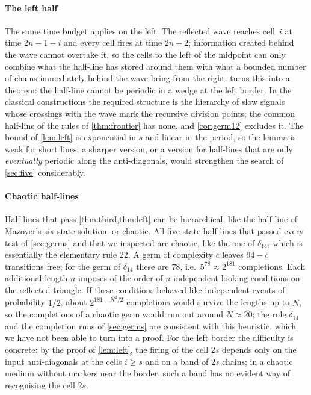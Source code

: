\paragraph{The left half}
The same time budget applies on the left. The reflected wave reaches
cell~$i$ at time $2n-1-i$ and every cell fires at time $2n-2$; information
created behind the wave cannot overtake it, so the cells to the left of the
midpoint can only combine what the half-line has stored around them with
what a bounded number of chains immediately behind the wave bring from the
right.  turns this into a theorem: the half-line cannot be
periodic in a wedge at the left border. In the classical constructions the
required structure is the hierarchy of slow signals whose crossings with
the wave mark the recursive division points; the common half-line of the
rules of \cref{thm:frontier} has none, and \cref{cor:germ12} excludes it.
The bound of \cref{lem:left} is exponential in $s$ and linear in the
period, so the lemma is weak for short lines; a sharper version, or a
version for half-lines that are only \emph{eventually} periodic along the
anti-diagonals, would strengthen the search of \cref{sec:five}
considerably.

\paragraph{Chaotic half-lines}
Half-lines that pass \cref{thm:third,thm:left} can be hierarchical, like
the half-line of Mazoyer's six-state solution, or chaotic. All five-state
half-lines that passed every test of \cref{sec:germs} and that we inspected
are chaotic, like the one of $\delta_{14}$, which is essentially the
elementary rule $22$. A germ of complexity $c$ leaves $94-c$ transitions
free; for the germ of $\delta_{14}$ these are $78$, i.e.\
$5^{78}\approx2^{181}$ completions. Each additional length $n$ imposes of the
order of $n$ independent-looking conditions on the reflected triangle. If
these conditions behaved like independent events of probability $1/2$,
about $2^{181-N^2/2}$ completions would survive the lengths up to $N$, so
the completions of a chaotic germ would run out around $N\approx20$; the
rule $\delta_{14}$ and the completion runs of \cref{sec:germs} are
consistent with this heuristic, which we have not been able to turn into a
proof. For the left border the difficulty is concrete: by the proof of
\cref{lem:left}, the firing of the cell $2s$ depends only on the input
anti-diagonals at the cells $i\ge s$ and on a band of $2s$ chains; in a
chaotic medium without markers near the border, such a band has no evident
way of recognising the cell $2s$.

